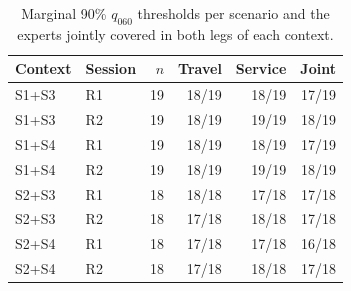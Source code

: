 \begin{table}[tb]
\centering
\caption{Marginal 90\% $q_{060}$ thresholds per scenario and the experts jointly covered in both legs of each context.}
\label{tab:reliability20-coverage}
\scriptsize\setlength{\tabcolsep}{3pt}
\begin{tabular}{@{}llrrrr@{}}
\toprule
Context & Session & $n$ & Travel & Service & Joint\\\midrule
S1+S3 & R1 & 19 & 18/19 & 18/19 & 17/19\\
S1+S3 & R2 & 19 & 18/19 & 19/19 & 18/19\\
S1+S4 & R1 & 19 & 18/19 & 18/19 & 17/19\\
S1+S4 & R2 & 19 & 18/19 & 19/19 & 18/19\\
S2+S3 & R1 & 18 & 18/18 & 17/18 & 17/18\\
S2+S3 & R2 & 18 & 17/18 & 18/18 & 17/18\\
S2+S4 & R1 & 18 & 17/18 & 17/18 & 16/18\\
S2+S4 & R2 & 18 & 17/18 & 18/18 & 17/18\\
\bottomrule
\end{tabular}
\end{table}
